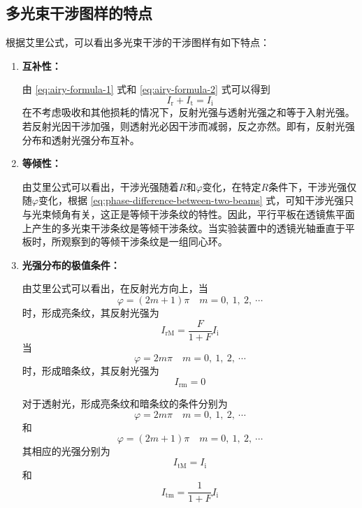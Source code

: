 \documentclass[cn,10pt,chinesefont=founder,math=mtpro2,cite=super,toc=onecol,twoside]{elegantbook}
\begin{document}
\subsection{多光束干涉图样的特点}
根据艾里公式，可以看出多光束干涉的干涉图样有如下特点：
\begin{enumerate}
	\item \textbf{互补性：}
	
	由 \eqref{eq:airy-formula-1} 式和 \eqref{eq:airy-formula-2} 式可以得到
	\begin{equation}
	I_{\mathrm{r}}+I_{\mathrm{t}}=I_{\mathrm{i}}
	\end{equation}
	在不考虑吸收和其他损耗的情况下，反射光强与透射光强之和等于入射光强。若反射光因干涉加强，则透射光必因干涉而减弱，反之亦然。即有，反射光强分布和透射光强分布互补。
	\item \textbf{等倾性：}
	
	由艾里公式可以看出，干涉光强随着$R$和$\varphi$变化，在特定$R$条件下，干涉光强仅随$\varphi$变化，根据 \eqref{eq:phase-difference-between-two-beams} 式，可知干涉光强只与光束倾角有关，这正是等倾干涉条纹的特性。因此，平行平板在透镜焦平面上产生的多光束干涉条纹是等倾干涉条纹。当实验装置中的透镜光轴垂直于平板时，所观察到的等倾干涉条纹是一组同心环。
	\item \textbf{光强分布的极值条件：}
	
	由艾里公式可以看出，在反射光方向上，当
	\begin{equation}
	\varphi=(2m+1)\pi\quad m=0,\ 1,\ 2,\ \cdots
	\end{equation}
	时，形成亮条纹，其反射光强为
	\begin{equation}
	I_{\mathrm{rM}}=\frac{F}{1+F}I_{\mathrm{i}}
	\end{equation}
	当
	\begin{equation}
	\varphi=2m\pi\quad m=0,\ 1,\ 2,\ \cdots
	\end{equation}
	时，形成暗条纹，其反射光强为
	\begin{equation}
	I_{\mathrm{rm}}=0
	\end{equation}
	
	对于透射光，形成亮条纹和暗条纹的条件分别为
	\begin{equation}
	\varphi=2m\pi\quad m=0,\ 1,\ 2,\ \cdots
	\end{equation}
	和
	\begin{equation}
	\varphi=(2m+1)\pi\quad m=0,\ 1,\ 2,\ \cdots
	\end{equation}
	其相应的光强分别为
	\begin{equation}
	I_{\mathrm{tM}}=I_{\mathrm{i}}
	\end{equation}
	和
	\begin{equation}
	I_{\mathrm{tm}}=\frac{1}{1+F}I_{\mathrm{i}}
	\end{equation}
\end{enumerate}
\end{document}

